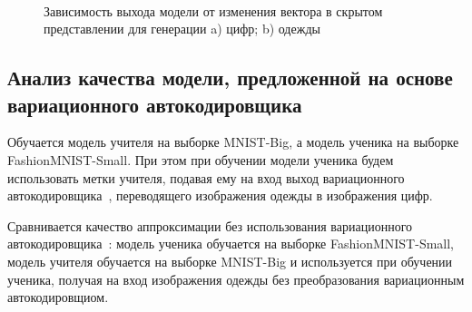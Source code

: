 \begin{figure}[h!t]\center
{}
\qquad
{}\\
\caption{Зависимость выхода модели от изменения вектора в скрытом представлении для генерации a) цифр; b) одежды}
\end{figure}

\subsection{Анализ качества модели, предложенной на основе вариационного автокодировщика}

Обучается модель учителя на выборке MNIST-Big, а модель ученика на выборке FashionMNIST-Small. При этом при обучении модели ученика будем использовать метки учителя, подавая ему на вход выход вариационного автокодировщика~\cite{VAE}, переводящего изображения одежды в изображения цифр.

Сравнивается качество аппроксимации без использования вариационного автокодировщика~\cite{VAE}: модель ученика обучается на выборке FashionMNIST-Small, модель учителя обучается на выборке MNIST-Big и используется при обучении ученика, получая на вход изображения одежды без преобразования вариационным автокодировщиом.\\

